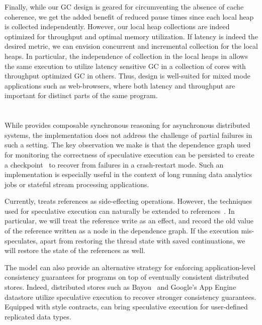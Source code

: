 Finally, while our GC design is geared for circumventing the absence of cache
coherence, we get the added benefit of reduced pause times since each local
heap is collected independently. However, our local heap collections are indeed
optimized for throughput and optimal memory utilization. If latency is indeed
the desired metric, we can envision concurrent and incremental collection for
the local heaps. In particular, the independence of collection in the local
heaps in \MMSCC allows the same execution to utilize latency sensitive GC in a
collection of cores with throughput optimized GC in others. Thus, \MMSCC
design is well-suited for mixed mode applications such as web-browsers, where
both latency and throughput are important for distinct parts of the same
program.

\section{\rxcml}

While \rxcml provides composable synchronous reasoning for asynchronous
distributed systems, the implementation does not address the challenge of
partial failures in such a setting. The key observation we make is that the
dependence graph used for monitoring the correctness of speculative execution
can be persisted to create a checkpoint~\cite{RollbackRecovery} to recover from
failures in a crash-restart mode. Such an implementation is especially useful
in the context of long running data analytics jobs or stateful stream
processing applications.

Currently, \rxcml treats references as side-effecting operations. However, the
techniques used for speculative execution can naturally be extended to
references~\cite{Ziarek10}. In particular, we will treat the reference write as
an effect, and record the old value of the reference written as a node in the
dependence graph. If the execution mis-speculates, apart from restoring the
thread state with saved continuations, we will restore the state of the
references as well.

The \rxcml model can also provide an alternative strategy for enforcing
application-level consistency guarantees for programs on top of eventually
consistent distributed stores. Indeed, distributed stores such as
Bayou~\cite{Bayou} and Google's App Engine datastore utilize speculative
execution to recover stronger consistency guarantees. Equipped with \quelea
style contracts, \rxcml can bring speculative execution for user-defined
replicated data types.

